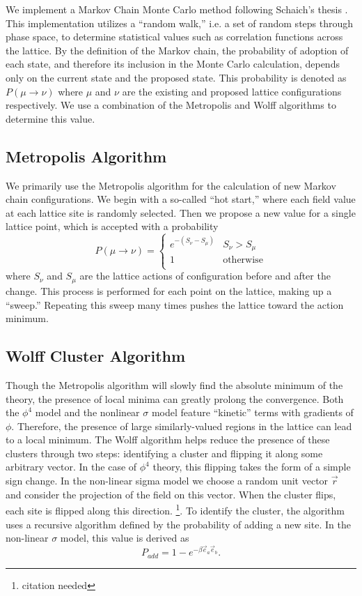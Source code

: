 \documentclass[12pt]{report}
\begin{document}
We implement a Markov Chain Monte Carlo method following Schaich's thesis \cite{schaich2006}. This implementation utilizes a ``random walk,'' i.e. a set of random steps through phase space, to determine statistical values such as correlation functions across the lattice. By the definition of the Markov chain, the probability of adoption of each state, and therefore its inclusion in the Monte Carlo calculation, depends only on the current state and the proposed state. This probability is denoted as $P(\mu\rightarrow\nu)$ where $\mu$ and $\nu$ are the existing and proposed lattice configurations respectively. We use a combination of the Metropolis and Wolff algorithms to determine this value.

\subsection{Metropolis Algorithm}
We primarily use the Metropolis algorithm for the calculation of new Markov chain configurations. We begin with a so-called ``hot start,'' where each field value at each lattice site is randomly selected. Then we propose a new value for a single lattice point, which is accepted with a probability
\begin{equation}
    P(\mu\rightarrow\nu) = \begin{cases} 
        e^{-(S_\nu - S_\mu)} & S_\nu > S_\mu \\
        1 & \mathrm{otherwise} \\
   \end{cases}
\end{equation}
where $S_\nu$ and $S_\mu$ are the lattice actions of configuration before and after the change. This process is performed for each point on the lattice, making up a ``sweep.'' Repeating this sweep many times pushes the lattice toward the action minimum.

\subsection{Wolff Cluster Algorithm}

Though the Metropolis algorithm will slowly find the absolute minimum of the theory, the presence of local minima can greatly prolong the convergence. Both the $\phi^4$ model and the nonlinear $\sigma$ model feature ``kinetic'' terms with gradients of $\phi$. Therefore, the presence of large similarly-valued regions in the lattice can lead to a local minimum. The Wolff algorithm helps reduce the presence of these clusters through two steps: identifying a cluster and flipping it along some arbitrary vector. In the case of $\phi^4$ theory, this flipping takes the form of a simple sign change. In the non-linear sigma model we choose a random unit vector $\vec r$ and consider the projection of the field on this vector. When the cluster flips, each site is flipped along this direction. \footnote{citation needed}. To identify the cluster, the algorithm uses a recursive algorithm defined by the probability of adding a new site. In the non-linear $\sigma$ model, this value is derived as 
\begin{equation}
    P_{add} = 1-e^{- \beta \vec e_a\vec e_b}.
\end{equation}
\end{document}
